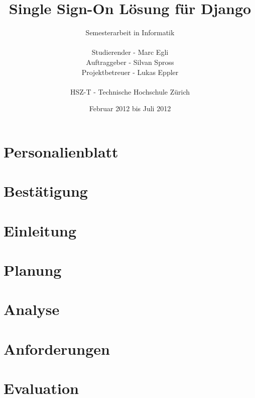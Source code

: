 \documentclass[
11pt, %
a4paper, %
BCOR10mm, %
DIV14, %
footsepline = false, %
headsepline, %
oneside, %
openright,
halfparskip, %
abstracton, %
listof=totocnumbered, %
bibliography=totocnumbered %
]{scrreprt}
\title{Single Sign-On Lösung für Django}
\author{Semesterarbeit in Informatik\\
    \\
    Studierender - Marc Egli\\
	Auftraggeber - Silvan Spross\\
    Projektbetreuer - Lukas Eppler\\
	\\
	HSZ-T - Technische Hochschule Zürich}
\date{Februar 2012 bis Juli 2012}
\begin{document}
  \ifpdf
  \else
  \fi
  
  \maketitle
  \begin{abstract}
    
  \end{abstract}

  
  \tableofcontents
  
  \chapter{Personalienblatt}
  
  
  \chapter{Bestätigung}
  
  
  \chapter{Einleitung}
  \label{cha:Einleitung}
  

  \chapter{Planung}
  \label{cha:Planung}
  
  
  \chapter{Analyse}
  \label{cha:Analyse}
  
  
  \chapter{Anforderungen}
  \label{cha:Anforderungen}
  
  
  \chapter{Evaluation}
  \label{cha:Evaluation}
  
  
\end{document}
